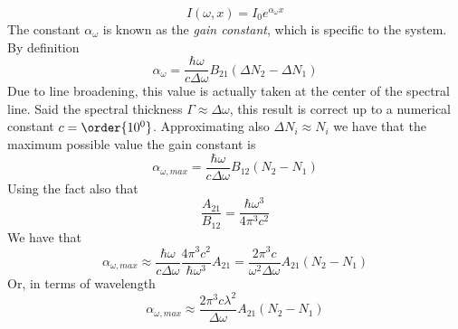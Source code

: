 \documentclass[../electromagnetism.tex]{subfiles}
\begin{document}
\begin{equation}
	I(\omega, x)=I_0e^{\alpha_\omega x}
	\label{eq:gain.se}
\end{equation}
The constant $\alpha_\omega$ is known as the \textit{gain constant}, which is specific to the system. By definition
\begin{equation}
	\alpha_\omega=\frac{\hbar\omega}{c\Delta\omega}B_{21}\left( \Delta N_2-\Delta N_1 \right)
	\label{eq:gainconstant.se}
\end{equation}
Due to line broadening, this value is actually taken at the center of the spectral line. Said the spectral thickness $\Gamma\approx\Delta\omega$, this result is correct up to a numerical constant $c=\order{ 10^{0} }$. Approximating also $\Delta N_i\approx N_i$ we have that the maximum possible value the gain constant is
\begin{equation}
	\alpha_{\omega, max}=\frac{\hbar\omega}{c\Delta\omega}B_{12}\left( N_2-N_1 \right)
	\label{eq:maxgain.se}
\end{equation}
Using the fact also that
\begin{equation*}
	\frac{A_{21}}{B_{12}}=\frac{\hbar\omega^3}{4\pi^3c^2}
\end{equation*}
We have that
\begin{equation}
	\alpha_{\omega, max}\approx\frac{\hbar\omega}{c\Delta\omega}\frac{4\pi^3c^2}{\hbar\omega^3}A_{21}=\frac{2\pi^3c}{\omega^2\Delta\omega}A_{21}\left( N_2-N_1 \right)
	\label{eq:a21alpha.se}
\end{equation}
Or, in terms of wavelength
\begin{equation}
	\alpha_{\omega, max}\approx\frac{2\pi^3c\lambda^2}{\Delta\omega}A_{21}\left( N_2-N_1 \right)
	\label{eq:a21alphalambda.se}
\end{equation}
\end{document}
